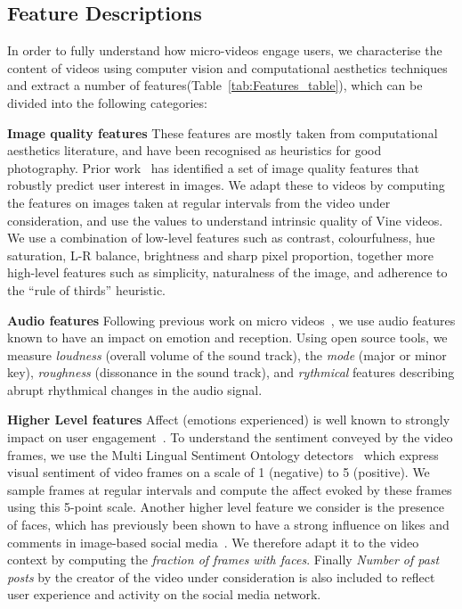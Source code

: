 \subsection{Feature Descriptions}
\label{sec:features}
In order to fully understand how micro-videos engage users, we characterise the content of videos using computer vision and computational aesthetics techniques and  extract a number of features(Table~\ref{tab:Features_table}), which can be divided into the following categories: 

	\noindent\textbf{Image quality features} These features are mostly taken from computational aesthetics literature, and have been recognised as heuristics for good photography. Prior work~\cite{predictingPintrest} has identified a set of image quality features that robustly predict user interest in images. We  adapt these to videos by computing  the features on images taken at regular intervals from the video under consideration, and use the values to understand intrinsic quality of Vine videos. We use a combination of low-level features such as contrast, colourfulness, hue saturation, L-R balance, brightness and sharp pixel proportion, together more high-level features such as simplicity, naturalness of the image, and adherence to the  ``rule of thirds'' heuristic. 
	
	\noindent\textbf{Audio features}	
	Following previous work on micro videos~\cite{redi20146}, we use audio features known to have an impact on emotion and reception. Using open source tools\cite{lartillot2007matlab,laurier2009exploring}, we measure \emph{loudness} (overall volume of the sound track), the \emph{mode} (major or minor key), \emph{roughness} (dissonance in the sound track), and \emph{rythmical} features describing abrupt rhythmical changes in the audio signal. 
	
	\noindent\textbf{Higher Level features} Affect (emotions experienced) is well known to strongly impact on user engagement~\cite{o2008user,leung2009user}. To understand the sentiment conveyed by the video frames, we use the Multi Lingual Sentiment Ontology detectors~\cite{jou2015visual} which express visual sentiment of video frames on a scale of 1 (negative) to 5 (positive). We sample frames at regular intervals and compute the affect evoked by these frames using this 5-point scale. Another higher level feature we consider is the presence of faces, which has previously been shown to have a strong influence on  likes and comments in image-based social media~\cite{bakhshi2014faces}. We therefore adapt it to the video context by computing the \emph{fraction of frames with faces}. Finally \emph{Number of past posts} by the creator of the video under consideration is also included to reflect user experience and activity on the social media network.
	
